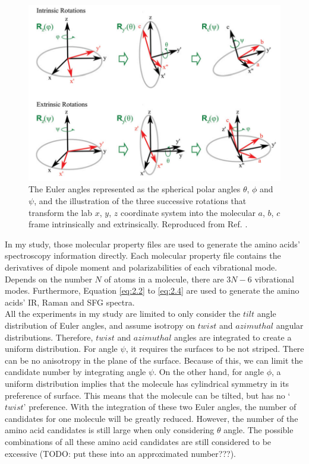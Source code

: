 \begin{figure}[!ht] 
\centering
\includegraphics[scale=0.5]{Figures/Euler_angles_represented_as_the_spherical_polar_angles.png} 
\caption{The Euler angles represented as the spherical polar angles $\theta$, $\phi$ and $\psi$, and the illustration of the three successive rotations that transform the lab $x$, $y$, $z$ coordinate system into the molecular $a$, $b$, $c$ frame intrinsically and extrinsically. Reproduced from Ref. . }
\label{fig:2.1}
\end{figure}

In my study, those molecular property files are used to generate the amino acids' spectroscopy information directly. Each molecular property file contains the derivatives of dipole moment and polarizabilities of each vibrational mode. Depends on the number $N$ of atoms in a molecule, there are $3N-6$ vibrational modes. Furthermore, Equation \ref{eq:2.2} to \ref{eq:2.4} are used to generate the amino acids' IR, Raman and SFG spectra. \\

All the experiments in my study are limited to only consider the $tilt$ angle distribution of Euler angles, and assume isotropy on $twist$ and $azimuthal$ angular distributions. Therefore, $twist$ and $azimuthal$ angles are integrated to create a uniform distribution. For angle $\psi$, it requires the surfaces to be not striped. There can be no anisotropy in the plane of the surface. Because of this, we can limit the candidate number by integrating angle $\psi$. On the other hand, for angle $\phi$, a uniform distribution implies that the molecule has cylindrical symmetry in its preference of surface. This means that the molecule can be tilted, but has no `$twist$' preference. With the integration of these two Euler angles, the number of candidates for one molecule will be greatly reduced. However, the number of the amino acid candidates is still large when only considering $\theta$ angle. The possible combinations of all these amino acid candidates are still considered to be excessive (TODO: put these into an approximated number???). \\

